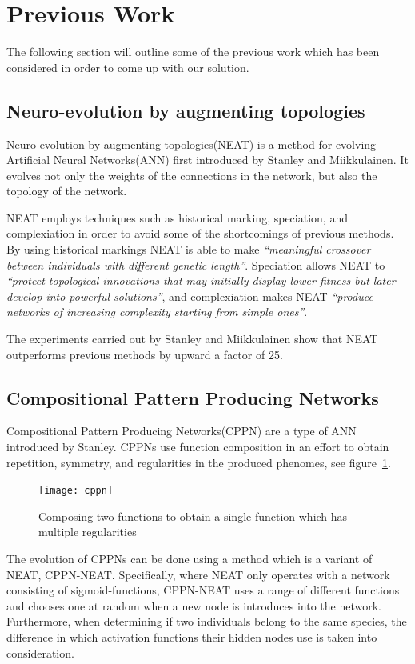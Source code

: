 \section{Previous Work}
The following section will outline some of the previous work which has been 
considered in order to come up with our solution.

\subsection{Neuro-evolution by augmenting topologies}
Neuro-evolution by augmenting topologies(NEAT) is a method for evolving 
Artificial Neural Networks(ANN) first introduced by Stanley and 
Miikkulainen\cite{stanley2002evolving}.
It evolves not only the weights of the connections in the network, but also the 
topology of the network.

NEAT employs techniques such as historical marking, speciation, and 
complexiation in order to avoid some of the shortcomings of previous methods.
By using historical markings NEAT is able to make \emph{``meaningful crossover 
between individuals with different
genetic length''}\cite[p.~50]{Floreano2008}.
Speciation allows NEAT to \emph{``protect topological innovations
that may initially display lower fitness but later
develop into powerful solutions''}\cite[p.~50]{Floreano2008}, and complexiation 
makes NEAT \emph{``produce networks of increasing complexity
starting from simple ones''}\cite[p.~50]{Floreano2008}.

The experiments carried out by Stanley and Miikkulainen show that NEAT 
outperforms previous methods by upward a factor of 
25\cite[p.~2]{stanley2002evolving}.
\subsection{Compositional Pattern Producing Networks}
\label{sec:cppn}
Compositional Pattern Producing Networks(CPPN) are a type of ANN introduced by 
Stanley\cite{Stanley2007}.
CPPNs use function composition in an effort to obtain repetition, symmetry, and 
regularities in the produced phenomes, see figure~\ref{fig:cppn}.
\begin{figure}[ht]
\centering
\texttt{[image: cppn]}
\caption{Composing two functions to obtain a single function which has multiple 
regularities \cite{Stanley2007}}
\label{fig:cppn}
\end{figure}

The evolution of CPPNs can be done using a method which is a variant of NEAT, 
CPPN-NEAT.
Specifically, where NEAT only operates with a network consisting of 
sigmoid-functions, CPPN-NEAT uses a range of different functions and chooses 
one at random when a new node is introduces into the network.
Furthermore, when determining if two individuals belong to the same species, 
the difference in which activation functions their hidden nodes use is taken 
into consideration.

